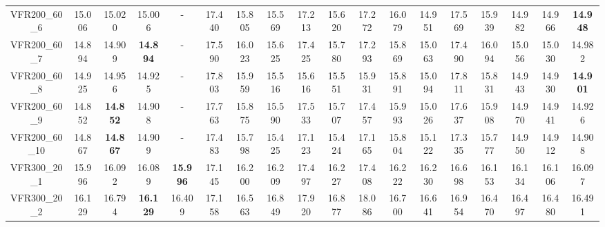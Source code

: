 \begin{tabular}{cc|ccc|ccccccccccccc}
VFR200\_60\_6      & 15.006           & 15.020           & 15.006           & -                & 17.440           & 15.805           & 15.569           & 17.213           & 15.620           & 17.272           & 16.079           & 14.951           & 17.569           & 15.939           & 14.982           & 14.966           & {\bf 14.948}    \\ 
VFR200\_60\_7      & 14.894           & 14.909           & {\bf 14.894}     & -                & 17.590           & 16.023           & 15.625           & 17.425           & 15.780           & 17.293           & 15.869           & 15.063           & 17.490           & 16.094           & 15.056           & 15.030           & 14.982          \\ 
VFR200\_60\_8      & 14.925           & 14.956           & 14.925           & -                & 17.803           & 15.959           & 15.516           & 15.616           & 15.551           & 15.931           & 15.891           & 15.094           & 17.811           & 15.831           & 14.943           & 14.930           & {\bf 14.901}    \\ 
VFR200\_60\_9      & 14.852           & {\bf 14.852}     & 14.908           & -                & 17.763           & 15.875           & 15.590           & 17.533           & 15.707           & 17.457           & 15.993           & 15.026           & 17.637           & 15.908           & 14.970           & 14.941           & 14.926          \\ 
VFR200\_60\_10     & 14.867           & {\bf 14.867}     & 14.909           & -                & 17.483           & 15.798           & 15.425           & 17.123           & 15.424           & 17.165           & 15.804           & 15.122           & 17.335           & 15.777           & 14.950           & 14.912           & 14.908          \\ 
VFR300\_20\_1      & 15.996           & 16.092           & 16.089           & {\bf 15.996}     & 17.145           & 16.200           & 16.209           & 17.497           & 16.227           & 17.408           & 16.222           & 16.230           & 16.698           & 16.153           & 16.134           & 16.106           & 16.097          \\ 
VFR300\_20\_2      & 16.129           & 16.794           & {\bf 16.129}     & 16.409           & 17.158           & 16.563           & 16.849           & 17.920           & 16.877           & 18.086           & 16.700           & 16.641           & 16.954           & 16.470           & 16.497           & 16.480           & 16.491          \\ 

\end{tabular}
